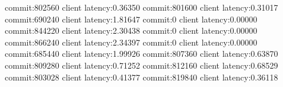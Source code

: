 commit:802560 client latency:0.36350
commit:801600 client latency:0.31017
commit:690240 client latency:1.81647
commit:0 client latency:0.00000
commit:844220 client latency:2.30438
commit:0 client latency:0.00000
commit:866240 client latency:2.34397
commit:0 client latency:0.00000
commit:685440 client latency:1.99926
commit:807360 client latency:0.63870
commit:809280 client latency:0.71252
commit:812160 client latency:0.68529
commit:803028 client latency:0.41377
commit:819840 client latency:0.36118
